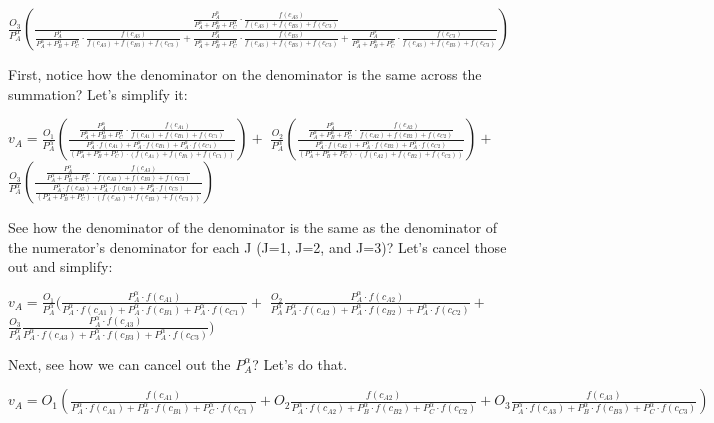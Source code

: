 \documentclass[]{elsarticle} %
\begin{document}
\(\frac{O_3}{P_{A}^\alpha}(\frac{\frac{P_{A}^\alpha}{P_{A}^\alpha+P_{B}^\alpha+P_{C}^\alpha} \cdot \frac{f(c_{A3})}{f(c_{A3})+f(c_{B3})+f(c_{C3})}}{\frac{P_{A}^\alpha}{P_{A}^\alpha+P_{B}^\alpha+P_{C}^\alpha} \cdot \frac{f(c_{A3})}{f(c_{A3})+f(c_{B3})+f(c_{C3})} + \frac{P_{A}^\alpha}{P_{A}^\alpha+P_{B}^\alpha+P_{C}^\alpha} \cdot \frac{f(c_{B3})}{f(c_{A3})+f(c_{B3})+f(c_{C3})}+\frac{P_{A}^\alpha}{P_{A}^\alpha+P_{B}^\alpha+P_{C}^\alpha} \cdot \frac{f(c_{C3})}{f(c_{A3})+f(c_{B3})+f(c_{C3})}} )\)

First, notice how the denominator on the denominator is the same across
the summation? Let's simplify it:

\(v_{A} = \frac{O_1}{P_{A}^\alpha}(\frac{\frac{P_{A}^\alpha}{P_{A}^\alpha+P_{B}^\alpha+P_{C}^\alpha} \cdot \frac{f(c_{A1})}{f(c_{A1})+f(c_{B1})+f(c_{C1})}}{\frac{P_{A}^\alpha \cdot f(c_{A1}) + P_{A}^\alpha \cdot f(c_{B1}) + P_{A}^\alpha \cdot f(c_{C1})}{(P_{A}^\alpha+P_{B}^\alpha+P_{C}^\alpha) \cdot (f(c_{A1})+f(c_{B1})+f(c_{C1}))}}) +\)
\(\frac{O_2}{P_{A}^\alpha}(\frac{\frac{P_{A}^\alpha}{P_{A}^\alpha+P_{B}^\alpha+P_{C}^\alpha} \cdot \frac{f(c_{A2})}{f(c_{A2})+f(c_{B2})+f(c_{C2})}}{\frac{P_{A}^\alpha \cdot f(c_{A2}) + P_{A}^\alpha \cdot f(c_{B2}) + P_{A}^\alpha \cdot f(c_{C2})}{(P_{A}^\alpha+P_{B}^\alpha+P_{C}^\alpha) \cdot (f(c_{A2})+f(c_{B2})+f(c_{C2}))}}) +\)
\(\frac{O_3}{P_{A}^\alpha}(\frac{\frac{P_{A}^\alpha}{P_{A}^\alpha+P_{B}^\alpha+P_{C}^\alpha} \cdot \frac{f(c_{A3})}{f(c_{A3})+f(c_{B3})+f(c_{C3})}}{\frac{P_{A}^\alpha \cdot f(c_{A3}) + P_{A}^\alpha \cdot f(c_{B3}) + P_{A}^\alpha \cdot f(c_{C3})}{(P_{A}^\alpha+P_{B}^\alpha+P_{C}^\alpha) \cdot (f(c_{A3})+f(c_{B3})+f(c_{C3}))}} )\)

See how the denominator of the denominator is the same as the
denominator of the numerator's denominator for each J (J=1, J=2, and
J=3)? Let's cancel those out and simplify:

\(v_{A} = \frac{O_1}{P_{A}^\alpha}(\frac{P_{A}^\alpha \cdot f(c_{A1})}{P_{A}^\alpha \cdot f(c_{A1}) + P_{A}^\alpha \cdot f(c_{B1}) + P_{A}^\alpha \cdot f(c_{C1})} +\)
\(\frac{O_2}{P_{A}^\alpha}\frac{P_{A}^\alpha \cdot f(c_{A2})}{P_{A}^\alpha \cdot f(c_{A2}) + P_{A}^\alpha \cdot f(c_{B2}) + P_{A}^\alpha \cdot f(c_{C2})} +\)
\(\frac{O_3}{P_{A}^\alpha}\frac{P_{A}^\alpha \cdot f(c_{A3})}{P_{A}^\alpha \cdot f(c_{A3}) + P_{A}^\alpha \cdot f(c_{B3}) + P_{A}^\alpha \cdot f(c_{C3})} )\)

Next, see how we can cancel out the \(P_{A}^\alpha\)? Let's do that.

\(v_{A} = O_1(\frac{f(c_{A1})}{P_{A}^\alpha \cdot f(c_{A1}) + P_{B}^\alpha \cdot f(c_{B1}) + P_{C}^\alpha \cdot f(c_{C1})} + O_2\frac{f(c_{A2})}{P_{A}^\alpha \cdot f(c_{A2}) + P_{B}^\alpha \cdot f(c_{B2}) + P_{C}^\alpha \cdot f(c_{C2})} + O_3\frac{f(c_{A3})}{P_{A}^\alpha \cdot f(c_{A3}) + P_{B}^\alpha \cdot f(c_{B3}) + P_{C}^\alpha \cdot f(c_{C3})} )\)
\end{document}
